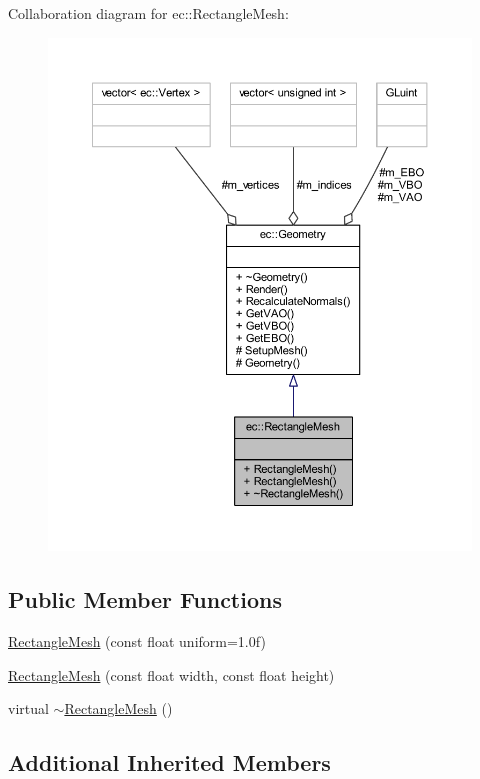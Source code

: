 Collaboration diagram for ec\+:\+:Rectangle\+Mesh\+:\nopagebreak
\begin{figure}[H]
\begin{center}
\leavevmode
\includegraphics[width=350pt]{classec_1_1_rectangle_mesh__coll__graph}
\end{center}
\end{figure}
\subsection*{Public Member Functions}
\begin{DoxyCompactItemize}
\item 
\mbox{\hyperlink{classec_1_1_rectangle_mesh_aa75e834f688d15a8ec8162e7a9ed1c05}{Rectangle\+Mesh}} (const float uniform=1.\+0f)
\item 
\mbox{\hyperlink{classec_1_1_rectangle_mesh_a7fe73fb3ef2979cb3d7230aaeffeecdd}{Rectangle\+Mesh}} (const float width, const float height)
\item 
virtual \mbox{\hyperlink{classec_1_1_rectangle_mesh_a520388a70dadc70155b2ade95f06d110}{$\sim$\+Rectangle\+Mesh}} ()
\end{DoxyCompactItemize}
\subsection*{Additional Inherited Members}


